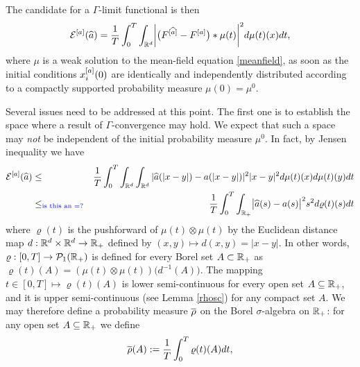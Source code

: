 The candidate for a $\Gamma$-limit functional is then
\begin{align}\label{ourfunctional}
	\mathcal E^{[a]}(\widehat a)=\frac{1}{T}\int_0^T \int_{\mathbb{R}^d} \biggl|\bigl(F^{[\widehat a]}-F^{[a]}\bigr)\ast\mu(t)\biggr|^2d\mu(t)(x)dt,
\end{align}
where $\mu$ is a weak solution to the mean-field equation \eqref{meanfield}, as soon as the initial conditions $x^{[a]}_i(0)$ are identically and independently 
distributed according to a compactly supported probability measure $\mu(0)=\mu^0$. 

Several issues  need to be addressed at this point.
The first one is to establish the space where a result of $\Gamma$-convergence may hold. 
We expect that such a space may {\it not} be independent of the initial probability measure $\mu^0$.
In fact, by Jensen inequality we have
\begin{eqnarray}
\mathcal E^{[a]}(\widehat a) 
&\leq & \frac{1}{T}\int_0^T  \int_{\mathbb{R}^d} \int_{\mathbb{R}^d}  | \widehat a(| x-y|) - a(| x-y|)|^2 | x-y|^2d \mu(t)(x) d \mu(t)(y) dt \label{est-functional-1}\\
&\leq _{\color{blue}{\text{is this an $=$?}}} & \frac{1}{T}  \int_0^T\int_{\mathbb{R}_+}\bigl|\widehat a(s)-a(s)\bigr|^2 s^2d\varrho(t)(s) dt \label{midpoint1}
\end{eqnarray}
where $\varrho(t)$ is the pushforward of $\mu(t)\otimes\mu(t)$ by the Euclidean distance map
	$d:\mathbb{R}^d\times\mathbb{R}^d\rightarrow\mathbb{R}_+$ %
 	defined by $(x,y)\mapsto d(x,y)=|x-y|$. %
In other words, $\varrho:[0,T]\rightarrow \mathcal{P}_1(\mathbb{R}_+)$ is defined for every Borel set $A\subset\mathbb{R}_+$ as $\varrho(t)(A)=(\mu(t)\otimes\mu(t))\bigl(d^{-1}(A)\bigr)$.
The mapping $t \in [0,T] \mapsto\varrho(t)(A)$ is lower semi-continuous for every open set $A\subseteq\mathbb{R}_+$, and it is upper semi-continuous (see Lemma \ref{rhosc}) for any compact set $A$.
We may therefore define a probability measure $\overline\rho$ on the Borel $\sigma$-algebra on $\mathbb{R}_+$: for any open set $A \subseteq \mathbb{R}_+$ we define
\begin{align}\label{finallyrho}%
	\prerho(A):=\frac{1}{T}\int_0^T\varrho(t)(A)dt,
\end{align}
